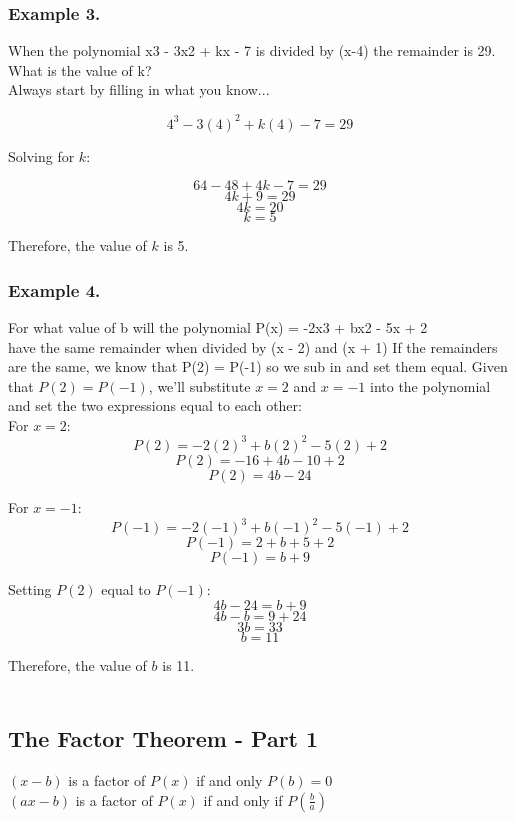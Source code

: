 \documentclass{article}
\begin{document}
\subsubsection*{Example 3.} When the polynomial x3 - 3x2 + kx - 7 is divided by (x-4) the
remainder is 29. What is the value of k?\\
Always start by filling in what you know...

\[ 4^3 - 3(4)^2 + k(4) - 7 = 29 \]

Solving for \( k \):

\[ 64 - 48 + 4k - 7 = 29 \]
\[ 4k + 9 = 29 \]
\[ 4k = 20 \]
\[ k = 5 \]

Therefore, the value of \( k \) is 5.

\newpage
\subsubsection*{Example 4.} For what value of b will the polynomial P(x) = -2x3 + bx2 - 5x + 2\\
have the same remainder when divided by (x - 2) and (x + 1)
If the remainders are the same, we know that P(2) = P(-1) so we sub in and
set them equal.
Given that \( P(2) = P(-1) \), we'll substitute \( x = 2 \) and \( x = -1 \) into the polynomial and set the two expressions equal to each other: \\

For \( x = 2 \):
\[ P(2) = -2(2)^3 + b(2)^2 - 5(2) + 2 \]
\[ P(2) = -16 + 4b - 10 + 2 \]
\[ P(2) = 4b - 24 \]

For \( x = -1 \):
\[ P(-1) = -2(-1)^3 + b(-1)^2 - 5(-1) + 2 \]
\[ P(-1) = 2 + b + 5 + 2 \]
\[ P(-1) = b + 9 \]

Setting \( P(2) \) equal to \( P(-1) \):
\[ 4b - 24 = b + 9 \]
\[ 4b - b = 9 + 24 \]
\[ 3b = 33 \]
\[ b = 11 \]

Therefore, the value of \( b \) is 11.\\\\
\subsection{The Factor Theorem - Part 1}
\begin{tcolorbox}[colback=blue!5!white,colframe=blue!75!black,title=The Factor Theorem ]
    $(x-b)$ is a factor of $P(x)$ if and only $P(b)=0$\\
    $(ax-b)$ is a factor of $P(x)$ if and only if $P\left(\frac{b}{a}\right)$
\end{tcolorbox}
\end{document}
